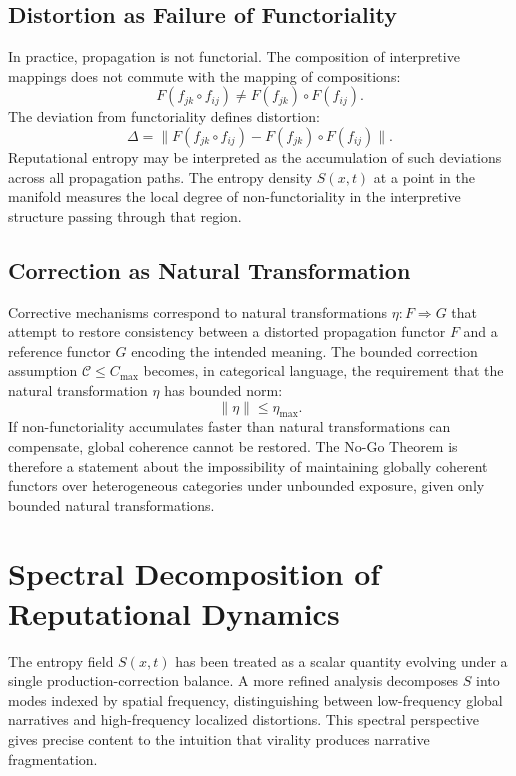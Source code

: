 \documentclass[12pt,a4paper]{article}
\begin{document}
\subsection{Distortion as Failure of Functoriality}

In practice, propagation is not functorial. The composition of interpretive mappings does not commute with the mapping of compositions:
\[
F(f_{jk} \circ f_{ij}) \neq F(f_{jk}) \circ F(f_{ij}).
\]
The deviation from functoriality defines distortion:
\[
\Delta = \|F(f_{jk} \circ f_{ij}) - F(f_{jk}) \circ F(f_{ij})\|.
\]
Reputational entropy may be interpreted as the accumulation of such deviations across all propagation paths. The entropy density $S(x,t)$ at a point in the manifold measures the local degree of non-functoriality in the interpretive structure passing through that region.

\subsection{Correction as Natural Transformation}

Corrective mechanisms correspond to natural transformations $\eta : F \Rightarrow G$ that attempt to restore consistency between a distorted propagation functor $F$ and a reference functor $G$ encoding the intended meaning. The bounded correction assumption $\mathcal{C} \leq C_{\max}$ becomes, in categorical language, the requirement that the natural transformation $\eta$ has bounded norm:
\[
\|\eta\| \leq \eta_{\max}.
\]
If non-functoriality accumulates faster than natural transformations can compensate, global coherence cannot be restored. The No-Go Theorem is therefore a statement about the impossibility of maintaining globally coherent functors over heterogeneous categories under unbounded exposure, given only bounded natural transformations.

\section{Spectral Decomposition of Reputational Dynamics}

The entropy field $S(x,t)$ has been treated as a scalar quantity evolving under a single production-correction balance. A more refined analysis decomposes $S$ into modes indexed by spatial frequency, distinguishing between low-frequency global narratives and high-frequency localized distortions. This spectral perspective gives precise content to the intuition that virality produces narrative fragmentation.
\end{document}
